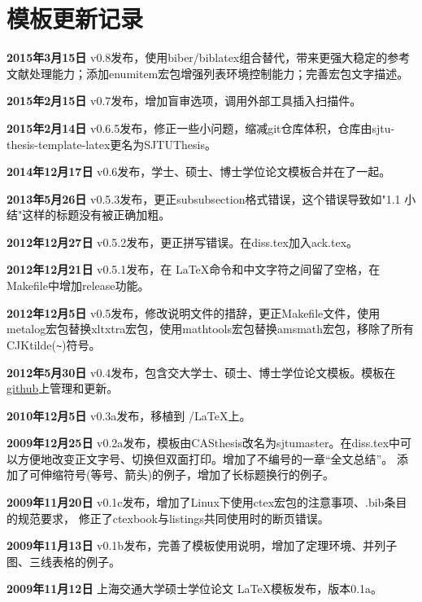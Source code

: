 
\chapter{模板更新记录}
\label{chap:updatelog}

\textbf{2015年3月15日} v0.8发布，使用biber/biblatex组合替代{\BibTeX}，带来更强大稳定的参考文献处理能力；添加enumitem宏包增强列表环境控制能力；完善宏包文字描述。

\textbf{2015年2月15日} v0.7发布，增加盲审选项，调用外部工具插入扫描件。

\textbf{2015年2月14日} v0.6.5发布，修正一些小问题，缩减git仓库体积，仓库由sjtu-thesis-template-latex更名为SJTUThesis。

\textbf{2014年12月17日} v0.6发布，学士、硕士、博士学位论文模板合并在了一起。

\textbf{2013年5月26日} v0.5.3发布，更正subsubsection格式错误，这个错误导致如"1.1 小结"这样的标题没有被正确加粗。

\textbf{2012年12月27日} v0.5.2发布，更正拼写错误。在diss.tex加入ack.tex。

\textbf{2012年12月21日} v0.5.1发布，在 \LaTeX 命令和中文字符之间留了空格，在Makefile中增加release功能。

\textbf{2012年12月5日} v0.5发布，修改说明文件的措辞，更正Makefile文件，使用metalog宏包替换xltxtra宏包，使用mathtools宏包替换amsmath宏包，移除了所有CJKtilde(\verb+~+)符号。

\textbf{2012年5月30日} v0.4发布，包含交大学士、硕士、博士学位论文模板。模板在\href{https://github.com/weijianwen/sjtu-thesis-template-latex}{github}上管理和更新。

\textbf{2010年12月5日} v0.3a发布，移植到 \XeTeX/\LaTeX 上。

\textbf{2009年12月25日} v0.2a发布，模板由CASthesis改名为sjtumaster。在diss.tex中可以方便地改变正文字号、切换但双面打印。增加了不编号的一章“全文总结”。
添加了可伸缩符号(等号、箭头)的例子，增加了长标题换行的例子。

\textbf{2009年11月20日} v0.1c发布，增加了Linux下使用ctex宏包的注意事项、.bib条目的规范要求，
修正了ctexbook与listings共同使用时的断页错误。

\textbf{2009年11月13日} v0.1b发布，完善了模板使用说明，增加了定理环境、并列子图、三线表格的例子。

\textbf{2009年11月12日} 上海交通大学硕士学位论文 \LaTeX 模板发布，版本0.1a。

